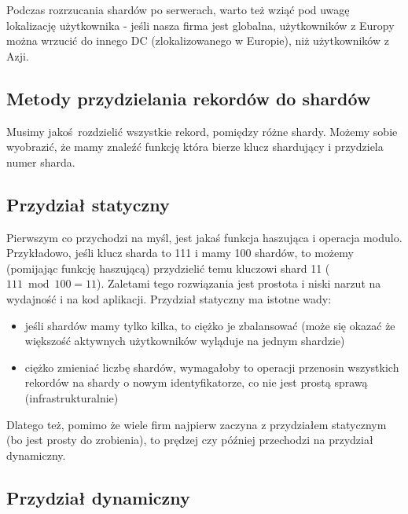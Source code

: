 \documentclass[a4paper,12pt]{article}
\begin{document}
Podczas rozrzucania shardów po serwerach, warto też wziąć pod uwagę lokalizację użytkownika - jeśli nasza firma jest globalna, użytkowników z Europy można wrzucić do innego DC (zlokalizowanego w Europie), niż użytkowników z Azji.

\subsection{Metody przydzielania rekordów do shardów}

Musimy jakoś rozdzielić wszystkie rekord, pomiędzy różne shardy. Możemy sobie wyobrazić, że mamy znaleźć funkcję która bierze klucz shardujący i przydziela numer sharda.

\subsection{Przydział statyczny}

Pierwszym co przychodzi na myśl, jest jakaś funkcja haszująca i operacja modulo. Przykładowo, jeśli klucz sharda to 111 i mamy 100 shardów, to możemy (pomijając funkcję haszującą) przydzielić temu kluczowi shard 11 ($111 \bmod 100 = 11$). Zaletami tego rozwiązania jest prostota i niski narzut na wydajność i na kod aplikacji. Przydział statyczny ma istotne wady:

\begin{itemize}
 \item jeśli shardów mamy tylko kilka, to ciężko je zbalansować (może się okazać że większość aktywnych użytkowników wyląduje na jednym shardzie)
 \item ciężko zmieniać liczbę shardów, wymagałoby to operacji przenosin wszystkich rekordów na shardy o nowym identyfikatorze, co nie jest prostą sprawą (infrastrukturalnie)
\end{itemize}

Dlatego też, pomimo że wiele firm najpierw zaczyna z przydziałem statycznym (bo jest prosty do zrobienia), to prędzej czy później przechodzi na przydział dynamiczny.

\subsection{Przydział dynamiczny}
\end{document}
